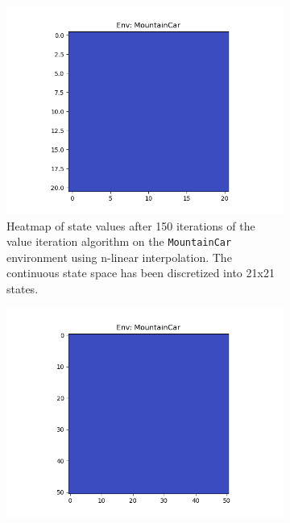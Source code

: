 \documentclass{article}
\begin{document}
\begin{enumerate}[(a)]
\begin{figure}[h!]
    \centering
    \begin{subfigure}{0.3\textwidth}
        \centering
        \includegraphics[width=\textwidth]{../figures/MountainCar_linear_21.png}
        \caption{Heatmap of state values after 150 iterations of the value iteration algorithm on the \texttt{MountainCar} environment using n-linear interpolation. The continuous state space has been discretized into 21x21 states.}
    \end{subfigure}
    \hspace{0.1 in}
    \begin{subfigure}{0.3\textwidth}
        \centering
        \includegraphics[width=\textwidth]{../figures/MountainCar_linear_51.png}

\end{subfigure}
\end{figure}
\end{enumerate}
\end{document}
